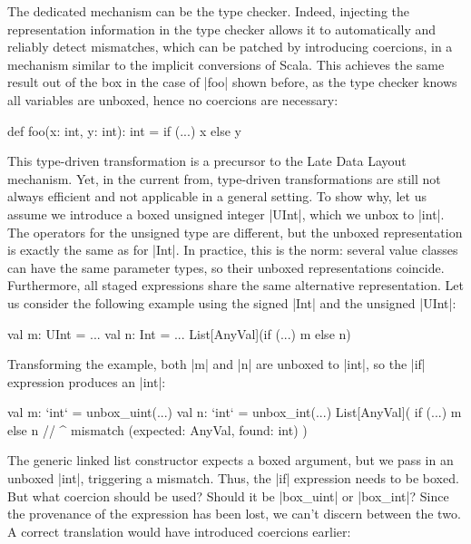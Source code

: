 The dedicated mechanism can be the type checker. Indeed, injecting the representation information in the type checker allows it to automatically and reliably detect mismatches, which can be patched by introducing coercions, in a mechanism similar to the implicit conversions of Scala. This achieves the same result out of the box in the case of |foo| shown before, as the type checker knows all variables are unboxed, hence no coercions are necessary:

\begin{lstlisting-nobreak}
 def foo(x: int, y: int): int =
   if (...) x else y
\end{lstlisting-nobreak}

This type-driven transformation is  a precursor to the Late Data Layout mechanism. Yet, in the current from, type-driven transformations are still not always efficient and not applicable in a general setting. To show why, let us assume we introduce a boxed unsigned integer |UInt|, which we unbox to |int|. The operators for the unsigned type are different, but the unboxed representation is exactly the same as for |Int|. In practice, this is the norm: several value classes can have the same parameter types, so their unboxed representations coincide. Furthermore, all staged expressions share the same alternative representation. Let us consider the following example using the signed |Int| and the unsigned |UInt|:

\begin{lstlisting-nobreak}
 val m: UInt = ...
 val n: Int = ...
 List[AnyVal](if (...) m else n)
\end{lstlisting-nobreak}

Transforming the example, both |m| and |n| are unboxed to |int|, so the |if| expression produces an |int|:

\begin{lstlisting-nobreak}
 val m: `int` = unbox_uint(...)
 val n: `int` = unbox_int(...)
 List[AnyVal](
   if (...) m else n
   // ^ mismatch (expected: AnyVal, found: int)
 )
\end{lstlisting-nobreak}

The generic linked list constructor expects a boxed argument, but we pass in an unboxed |int|, triggering a mismatch. Thus, the |if| expression needs to be boxed. But what coercion should be used? Should it be |box_uint| or |box_int|? Since the provenance of the expression has been lost, we can't discern between the two. A correct translation would have introduced coercions earlier:

